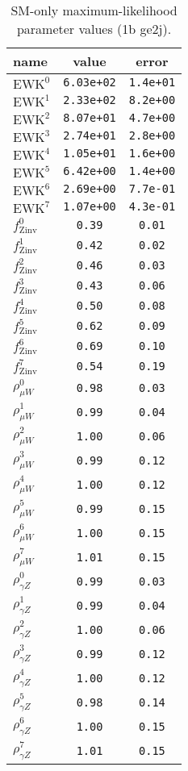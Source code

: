 \documentclass{article}
\begin{document}
\begin{table}\centering
\caption{SM-only maximum-likelihood parameter values (1b ge2j).}
\label{tab:mlParameterValues1b_ge2j}
\begin{tabular}{lcc}name & value & error \\ \hline
$\mathrm{EWK}^{0}$ & {\tt  6.03e+02} & {\tt  1.4e+01}\\
$\mathrm{EWK}^{1}$ & {\tt  2.33e+02} & {\tt  8.2e+00}\\
$\mathrm{EWK}^{2}$ & {\tt  8.07e+01} & {\tt  4.7e+00}\\
$\mathrm{EWK}^{3}$ & {\tt  2.74e+01} & {\tt  2.8e+00}\\
$\mathrm{EWK}^{4}$ & {\tt  1.05e+01} & {\tt  1.6e+00}\\
$\mathrm{EWK}^{5}$ & {\tt  6.42e+00} & {\tt  1.4e+00}\\
$\mathrm{EWK}^{6}$ & {\tt  2.69e+00} & {\tt  7.7e-01}\\
$\mathrm{EWK}^{7}$ & {\tt  1.07e+00} & {\tt  4.3e-01}\\
$f_\mathrm{Zinv}^{0}$ & {\tt 0.39} & {\tt 0.01}\\
$f_\mathrm{Zinv}^{1}$ & {\tt 0.42} & {\tt 0.02}\\
$f_\mathrm{Zinv}^{2}$ & {\tt 0.46} & {\tt 0.03}\\
$f_\mathrm{Zinv}^{3}$ & {\tt 0.43} & {\tt 0.06}\\
$f_\mathrm{Zinv}^{4}$ & {\tt 0.50} & {\tt 0.08}\\
$f_\mathrm{Zinv}^{5}$ & {\tt 0.62} & {\tt 0.09}\\
$f_\mathrm{Zinv}^{6}$ & {\tt 0.69} & {\tt 0.10}\\
$f_\mathrm{Zinv}^{7}$ & {\tt 0.54} & {\tt 0.19}\\
$\rho_{\mu W}^{0}$ & {\tt 0.98} & {\tt 0.03}\\
$\rho_{\mu W}^{1}$ & {\tt 0.99} & {\tt 0.04}\\
$\rho_{\mu W}^{2}$ & {\tt 1.00} & {\tt 0.06}\\
$\rho_{\mu W}^{3}$ & {\tt 0.99} & {\tt 0.12}\\
$\rho_{\mu W}^{4}$ & {\tt 1.00} & {\tt 0.12}\\
$\rho_{\mu W}^{5}$ & {\tt 0.99} & {\tt 0.15}\\
$\rho_{\mu W}^{6}$ & {\tt 1.00} & {\tt 0.15}\\
$\rho_{\mu W}^{7}$ & {\tt 1.01} & {\tt 0.15}\\
$\rho_{\gamma Z}^{0}$ & {\tt 0.99} & {\tt 0.03}\\
$\rho_{\gamma Z}^{1}$ & {\tt 0.99} & {\tt 0.04}\\
$\rho_{\gamma Z}^{2}$ & {\tt 1.00} & {\tt 0.06}\\
$\rho_{\gamma Z}^{3}$ & {\tt 0.99} & {\tt 0.12}\\
$\rho_{\gamma Z}^{4}$ & {\tt 1.00} & {\tt 0.12}\\
$\rho_{\gamma Z}^{5}$ & {\tt 0.98} & {\tt 0.14}\\
$\rho_{\gamma Z}^{6}$ & {\tt 1.00} & {\tt 0.15}\\
$\rho_{\gamma Z}^{7}$ & {\tt 1.01} & {\tt 0.15}\\
\hline
\end{tabular}
\end{table}
\end{document}
